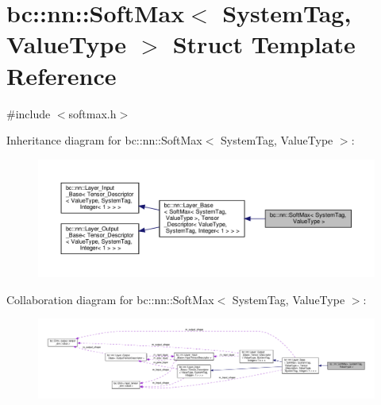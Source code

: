 \hypertarget{structbc_1_1nn_1_1SoftMax}{}\section{bc\+:\+:nn\+:\+:Soft\+Max$<$ System\+Tag, Value\+Type $>$ Struct Template Reference}
\label{structbc_1_1nn_1_1SoftMax}


{\ttfamily \#include $<$softmax.\+h$>$}



Inheritance diagram for bc\+:\+:nn\+:\+:Soft\+Max$<$ System\+Tag, Value\+Type $>$\+:\nopagebreak
\begin{figure}[H]
\begin{center}
\leavevmode
\includegraphics[width=350pt]{structbc_1_1nn_1_1SoftMax__inherit__graph}
\end{center}
\end{figure}


Collaboration diagram for bc\+:\+:nn\+:\+:Soft\+Max$<$ System\+Tag, Value\+Type $>$\+:\nopagebreak
\begin{figure}[H]
\begin{center}
\leavevmode
\includegraphics[width=350pt]{structbc_1_1nn_1_1SoftMax__coll__graph}
\end{center}
\end{figure}
